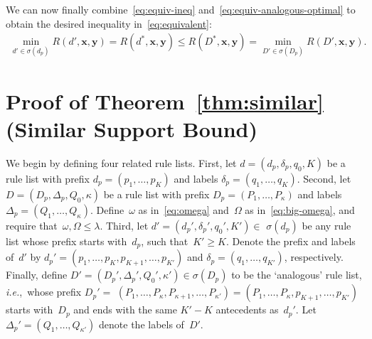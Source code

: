 \documentclass[twoside,11pt]{article}
\def\ie{{\it i.e.},~}
\newcommand{\x}{\mathbf{x}}
\newcommand{\y}{\mathbf{y}}
\def\RL{{d}}
\def\Prefix{d_p}
\def\Labels{\delta_p}
\def\Default{q_0}
\def\RLB{{D}}
\def\PrefixB{D_p}
\def\LabelsB{\Delta_p}
\def\DefaultB{Q_0}
\def\Obj{R}
\def\Reg{{\lambda}}
\def\StartsWith{\sigma}
\newcommand{\nn}{\nonumber}
\begin{document}
We can now finally combine~\eqref{eq:equiv-ineq}
and~\eqref{eq:equiv-analogous-optimal} to obtain the desired inequality in~\eqref{eq:equivalent}:
\begin{align}
\min_{\RL' \in \StartsWith(\Prefix)} \Obj(\RL', \x, \y)
= \Obj(\RL^*, \x, \y) \le \Obj(\RLB^*, \x, \y)
= \min_{\RLB' \in \StartsWith(\PrefixB)} \Obj(\RLB', \x, \y). \nn
\end{align}

\section{Proof of Theorem~\ref{thm:similar} (Similar Support Bound)}
\label{appendix:similar-supp}

We begin by defining four related rule lists.
%
First, let ${\RL = (\Prefix, \Labels, \Default, K)}$
be a rule list with prefix ${\Prefix = (p_1, \dots, p_K)}$
and labels ${\Labels = (q_1, \dots, q_K)}$.
%
Second, let ${\RLB = (\PrefixB, \LabelsB, \DefaultB, \kappa)}$
be a rule list with prefix ${\PrefixB = (P_1, \dots, P_\kappa)}$
and labels ${\LabelsB = (Q_1, \dots, Q_\kappa)}$.
%
Define~$\omega$ as in~\eqref{eq:omega}
and~$\Omega$ as in~\eqref{eq:big-omega},
and require that~${\omega, \Omega \le \Reg}$.
%
Third, let ${\RL' = (\Prefix', \Labels', \Default', K') \in}$
${\StartsWith(\Prefix)}$ be any rule list
whose prefix starts with~$\Prefix$, such that~${K' \ge K}$.
%
Denote the prefix and labels of~$\RL'$ by
${\Prefix' = (p_1, \dots, p_K, p_{K+1}, \dots, p_{K'})}$
and ${\Labels = (q_1, \dots, q_{K'})}$,
respectively.
%
Finally, define
${\RLB' = (\PrefixB', \LabelsB', \DefaultB', \kappa') \in \StartsWith(\PrefixB)}$
to be the `analogous' rule list, \ie whose prefix
${\PrefixB' =}$ ${(P_1, \dots, P_\kappa, P_{\kappa+1}, \dots, P_{\kappa'})
= (P_1, \dots, P_\kappa, p_{K+1}, \dots, p_{K'})}$
starts with~$\PrefixB$ and ends with the same ${K'-K}$
antecedents as~$\Prefix'$.
%
Let ${\LabelsB' = (Q_1, \dots, Q_{\kappa'})}$
denote the labels of~$\RLB'$.
\end{document}
